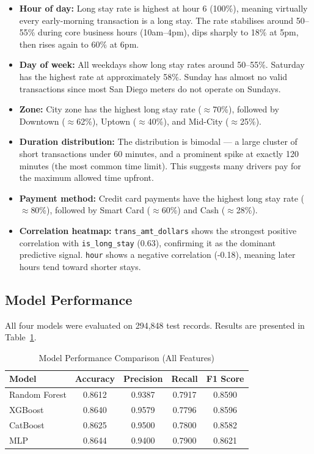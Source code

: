 \documentclass[12pt, a4paper]{article}
\begin{document}
\begin{itemize}
    \item \textbf{Hour of day:} Long stay rate is highest at hour 6
    (100\%), meaning virtually every early-morning transaction is a
    long stay. The rate stabilises around 50--55\% during core
    business hours (10am--4pm), dips sharply to 18\% at 5pm,
    then rises again to 60\% at 6pm.

    \item \textbf{Day of week:} All weekdays show long stay rates
    around 50--55\%. Saturday has the highest rate at approximately
    58\%. Sunday has almost no valid transactions since most San Diego
    meters do not operate on Sundays.

    \item \textbf{Zone:} City zone has the highest long stay rate
    ($\approx$70\%), followed by Downtown ($\approx$62\%), Uptown
    ($\approx$40\%), and Mid-City ($\approx$25\%).

    \item \textbf{Duration distribution:} The distribution is bimodal
    --- a large cluster of short transactions under 60 minutes, and a
    prominent spike at exactly 120 minutes (the most common time
    limit). This suggests many drivers pay for the maximum allowed
    time upfront.

    \item \textbf{Payment method:} Credit card payments have the
    highest long stay rate ($\approx$80\%), followed by Smart Card
    ($\approx$60\%) and Cash ($\approx$28\%).

    \item \textbf{Correlation heatmap:} \texttt{trans\_amt\_dollars}
    shows the strongest positive correlation with
    \texttt{is\_long\_stay} (0.63), confirming it as the dominant
    predictive signal. \texttt{hour} shows a negative correlation
    (-0.18), meaning later hours tend toward shorter stays.
\end{itemize}

\subsection{Model Performance}

All four models were evaluated on 294,848 test records. Results are
presented in Table~\ref{tab:results}.

\begin{table}[H]
\centering
\caption{Model Performance Comparison (All Features)}
\label{tab:results}
\begin{tabular}{@{}lcccc@{}}
\toprule
\textbf{Model} & \textbf{Accuracy} & \textbf{Precision} &
\textbf{Recall} & \textbf{F1 Score} \\
\midrule
Random Forest & 0.8612 & 0.9387 & 0.7917 & 0.8590 \\
XGBoost       & 0.8640 & 0.9579 & 0.7796 & 0.8596 \\
CatBoost      & 0.8625 & 0.9500 & 0.7800 & 0.8582 \\
MLP           & 0.8644 & 0.9400 & 0.7900 & 0.8621 \\
\bottomrule
\end{tabular}
\end{table}
\end{document}
